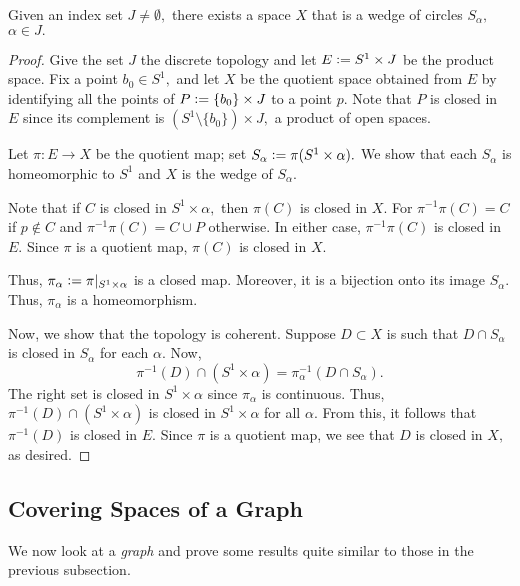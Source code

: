 \documentclass[12pt]{article}
\begin{document}
\begin{prop} \label{prop:existencewedgeofcircles}
	Given an index set $J \neq \emptyset,$ there exists a space $X$ that is a wedge of circles $S_\alpha,$ $\alpha \in J.$
\end{prop}
\begin{proof} 
	Give the set $J$ the discrete topology and let $E \vcentcolon= S^1 \times J$ be the product space. Fix a point $b_0 \in S^1,$ and let $X$ be the quotient space obtained from $E$ by identifying all the points of $P \vcentcolon= \{b_0\}\times J$ to a point $p.$ Note that $P$ is closed in $E$ since its complement is $(S^1\setminus\{b_0\})\times J,$ a product of open spaces.

	Let $\pi:E\to X$ be the quotient map; set $S_\alpha \vcentcolon= \pi(S^1\times\alpha).$ We show that each $S_\alpha$ is homeomorphic to $S^1$ and $X$ is the wedge of $S_\alpha.$

	Note that if $C$ is closed in $S^1\times\alpha,$ then $\pi(C)$ is closed in $X.$ For $\pi^{-1}\pi(C) = C$ if $p \notin C$ and $\pi^{-1}\pi(C) = C \cup P$ otherwise. In either case, $\pi^{-1}\pi(C)$ is closed in $E.$ Since $\pi$ is a quotient map, $\pi(C)$ is closed in $X.$

	Thus, $\pi_\alpha \vcentcolon= \pi|_{S^1\times\alpha}$ is a closed map. Moreover, it is a bijection onto its image $S_\alpha.$ Thus, $\pi_\alpha$ is a homeomorphism.

	Now, we show that the topology is coherent. Suppose $D \subset X$ is such that $D \cap S_\alpha$ is closed in $S_\alpha$ for each $\alpha.$ Now,
	\begin{equation*} 
		\pi^{-1}(D) \cap (S^1 \times \alpha) = \pi_\alpha^{-1}(D \cap S_\alpha).
	\end{equation*}
	The right set is closed in $S^1 \times \alpha$ since $\pi_\alpha$ is continuous. Thus, $\pi^{-1}(D) \cap (S^1 \times \alpha)$ is closed in $S^1 \times \alpha$ for all $\alpha.$ From this, it follows that $\pi^{-1}(D)$ is closed in $E.$ Since $\pi$ is a quotient map, we see that $D$ is closed in $X,$ as desired.
\end{proof}

\subsection{Covering Spaces of a Graph}

We now look at a \emph{graph} and prove some results quite similar to those in the previous subsection.
\end{document}
